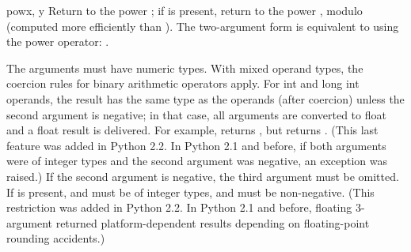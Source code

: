 \begin{funcdesc}{pow}{x, y}
  Return  to the power ; if  is present, return
   to the power , modulo  (computed more
  efficiently than ).
  The two-argument form  is equivalent to using
  the power operator: .
  
  The arguments must have numeric types.  With mixed operand types, the
  coercion rules for binary arithmetic operators apply.  For int and
  long int operands, the result has the same type as the operands
  (after coercion) unless the second argument is negative; in that
  case, all arguments are converted to float and a float result is
  delivered.  For example,  returns , but
   returns .  (This last feature was added in
  Python 2.2.  In Python 2.1 and before, if both arguments were of integer
  types and the second argument was negative, an exception was raised.)
  If the second argument is negative, the third argument must be omitted.
  If  is present,  and  must be of integer types,
  and  must be non-negative.  (This restriction was added in
  Python 2.2.  In Python 2.1 and before, floating 3-argument 
  returned platform-dependent results depending on floating-point
  rounding accidents.)
\end{funcdesc}

